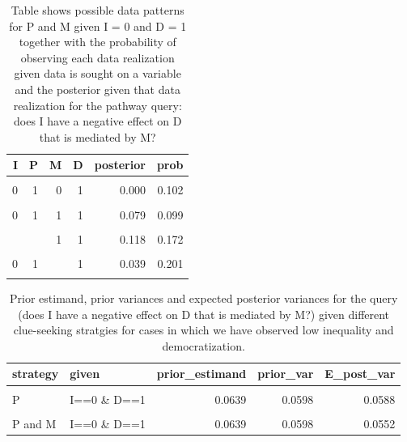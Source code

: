 \documentclass[
  12pt,
]{book}
\begin{document}
\begin{table}

\caption{\label{tab:pimdout}Table shows possible data patterns for P and M given I = 0 and D = 1 together with the probability of observing each data realization given data is sought on a variable and the posterior given that data realization for the pathway query: does I have a negative effect on D that is mediated by M?}
\centering
\begin{tabular}[t]{rrrrrr}
\toprule
I & P & M & D & posterior & prob\\
\midrule
\cellcolor{gray!6}{0} & \cellcolor{gray!6}{0} & \cellcolor{gray!6}{0} & \cellcolor{gray!6}{1} & \cellcolor{gray!6}{0.000} & \cellcolor{gray!6}{0.044}\\
0 & 1 & 0 & 1 & 0.000 & 0.102\\
\cellcolor{gray!6}{0} & \cellcolor{gray!6}{0} & \cellcolor{gray!6}{1} & \cellcolor{gray!6}{1} & \cellcolor{gray!6}{0.171} & \cellcolor{gray!6}{0.073}\\
0 & 1 & 1 & 1 & 0.079 & 0.099\\
\cellcolor{gray!6}{0} & \cellcolor{gray!6}{} & \cellcolor{gray!6}{0} & \cellcolor{gray!6}{1} & \cellcolor{gray!6}{0.000} & \cellcolor{gray!6}{0.146}\\
\addlinespace
0 &  & 1 & 1 & 0.118 & 0.172\\
\cellcolor{gray!6}{0} & \cellcolor{gray!6}{0} & \cellcolor{gray!6}{} & \cellcolor{gray!6}{1} & \cellcolor{gray!6}{0.107} & \cellcolor{gray!6}{0.117}\\
0 & 1 &  & 1 & 0.039 & 0.201\\
\cellcolor{gray!6}{0} & \cellcolor{gray!6}{} & \cellcolor{gray!6}{} & \cellcolor{gray!6}{1} & \cellcolor{gray!6}{0.064} & \cellcolor{gray!6}{0.318}\\
\bottomrule
\end{tabular}
\end{table}

\begin{table}

\caption{\label{tab:pimdlearnpath}Prior estimand, prior variances and expected posterior variances for the query (does I have a negative effect on D that is mediated by M?) given different  clue-seeking  stratgies for cases in which we have observed low inequality and democratization.}
\centering
\begin{tabular}[t]{llrrr}
\toprule
strategy & given & prior\_estimand & prior\_var & E\_post\_var\\
\midrule
\cellcolor{gray!6}{None} & \cellcolor{gray!6}{I==0 \& D==1} & \cellcolor{gray!6}{0.0639} & \cellcolor{gray!6}{0.0598} & \cellcolor{gray!6}{0.0598}\\
P & I==0 \& D==1 & 0.0639 & 0.0598 & 0.0588\\
\cellcolor{gray!6}{M} & \cellcolor{gray!6}{I==0 \& D==1} & \cellcolor{gray!6}{0.0639} & \cellcolor{gray!6}{0.0598} & \cellcolor{gray!6}{0.0564}\\
P and M & I==0 \& D==1 & 0.0639 & 0.0598 & 0.0552\\
\bottomrule
\end{tabular}
\end{table}
\end{document}
